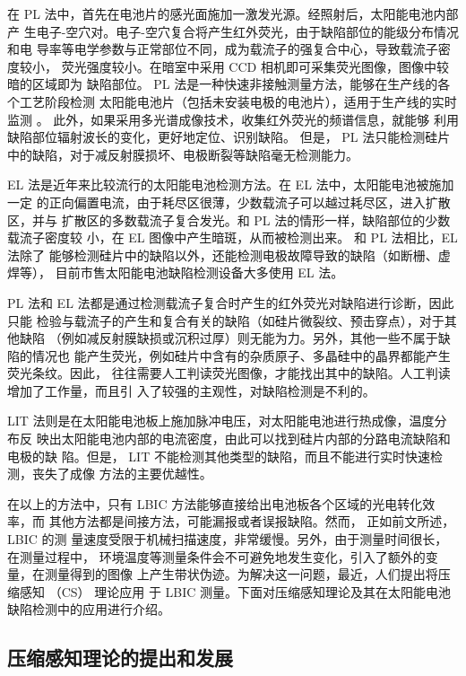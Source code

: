 在 PL 法中，首先在电池片的感光面施加一激发光源。经照射后，太阳能电池内部产
生电子-空穴对。电子-空穴复合将产生红外荧光，由于缺陷部位的能级分布情况和电
导率等电学参数与正常部位不同，成为载流子的强复合中心，导致载流子密度较小，
荧光强度较小。在暗室中采用 CCD 相机即可采集荧光图像，图像中较暗的区域即为
缺陷部位。 PL 法是一种快速非接触测量方法，能够在生产线的各个工艺阶段检测
太阳能电池片（包括未安装电极的电池片），适用于生产线的实时监测
\cite{FastPL}。 此外，如果采用多光谱成像技术，收集红外荧光的频谱信息，就能够
利用缺陷部位辐射波长的变化，更好地定位、识别缺陷\cite{SpectrePL}。 但是，
PL 法只能检测硅片中的缺陷，对于减反射膜损坏、电极断裂等缺陷毫无检测能力。

EL 法是近年来比较流行的太阳能电池检测方法。在 EL 法中，太阳能电池被施加一定
的正向偏置电流，由于耗尽区很薄，少数载流子可以越过耗尽区，进入扩散区，并与
扩散区的多数载流子复合发光。和 PL 法的情形一样，缺陷部位的少数载流子密度较
小，在 EL 图像中产生暗斑，从而被检测出来\cite{EL}。 和 PL 法相比，EL 法除了
能够检测硅片中的缺陷以外，还能检测电极故障导致的缺陷（如断栅、虚焊等），
目前市售太阳能电池缺陷检测设备大多使用 EL 法。

PL 法和 EL 法都是通过检测载流子复合时产生的红外荧光对缺陷进行诊断，因此只能
检验与载流子的产生和复合有关的缺陷（如硅片微裂纹、预击穿点），对于其他缺陷
（例如减反射膜缺损或沉积过厚）则无能为力。另外，其他一些不属于缺陷的情况也
能产生荧光，例如硅片中含有的杂质原子、多晶硅中的晶界都能产生荧光条纹。因此，
往往需要人工判读荧光图像，才能找出其中的缺陷。人工判读增加了工作量，而且引
入了较强的主观性，对缺陷检测是不利的。

LIT 法则是在太阳能电池板上施加脉冲电压，对太阳能电池进行热成像，温度分布反
映出太阳能电池内部的电流密度，由此可以找到硅片内部的分路电流缺陷和电极的缺
陷。但是， LIT 不能检测其他类型的缺陷，而且不能进行实时快速检测，丧失了成像
方法的主要优越性。

在以上的方法中，只有 LBIC 方法能够直接给出电池板各个区域的光电转化效率，而
其他方法都是间接方法，可能漏报或者误报缺陷。然而， 正如前文所述， LBIC 的测
量速度受限于机械扫描速度，非常缓慢。另外，由于测量时间很长，在测量过程中，
环境温度等测量条件会不可避免地发生变化，引入了额外的变量，在测量得到的图像
上产生带状伪迹。为解决这一问题，最近，人们提出将压缩感知 （CS） 理论应用
于 LBIC 测量。下面对压缩感知理论及其在太阳能电池缺陷检测中的应用进行介绍。 

\subsection{压缩感知理论的提出和发展}

